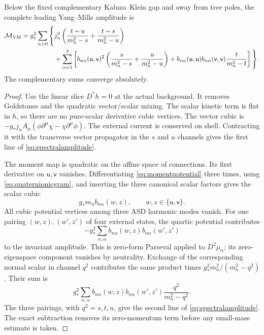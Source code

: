 \begin{proposition}\label{prop:spectralamplitude}
Below the fixed complementary Kaluza--Klein gap and away from tree poles,
the complete leading Yang--Mills amplitude is
\begin{align}\label{eq:spectralamplitude}
 \mathcal M_{\rm YM}=g_*^2\sum_{n>0}\Bigg\{&
 j_n^2\left(\frac{t-u}{m_n^2-s}+\frac{t-s}{m_n^2-u}\right)\nonumber\\
 &+\sum_{\alpha=1}^3\left[
 b_{n\alpha}(\mathsf u,\mathsf v)^2
 \left(\frac{s}{m_n^2-s}+\frac{u}{m_n^2-u}\right)
 +b_{n\alpha}(\mathsf u,\mathsf u)b_{n\alpha}(\mathsf v,\mathsf v)
 \frac{t}{m_n^2-t}\right]\Bigg\}.
\end{align}
The complementary sums converge absolutely.
\end{proposition}
\begin{proof}
Use the linear slice $D^*h=0$ at the actual background. It removes
Goldstones and the quadratic vector/scalar mixing. The scalar kinetic
term is flat in $h$, so there are no pure-scalar derivative cubic
vertices. The vector cubic is
$-g_*j_n A_\mu(\phi\partial^\mu\chi-\chi\partial^\mu\phi)$.
The external current is conserved on shell. Contracting it with the
transverse vector propagator in the $s$ and $u$ channels gives the first
line of \eqref{eq:spectralamplitude}.

The moment map is quadratic on the affine space of connections. Its
first derivative on $\mathsf u,\mathsf v$ vanishes. Differentiating
\eqref{eq:momentpotential} three times, using
\eqref{eq:quaternionicgram}, and inserting the three canonical scalar
factors gives the scalar cubic
\begin{equation}\label{eq:scalarcubic}
 g_*m_n b_{n\alpha}(w,z),\qquad w,z\in\{\mathsf u,\mathsf v\}.
\end{equation}
All cubic potential vertices among three ASD harmonic modes vanish.
For one pairing $(w,z),(w',z')$ of four external states, the quartic
potential contributes
\[
 -g_*^2\sum_{n,\alpha}b_{n\alpha}(w,z)b_{n\alpha}(w',z')
\]
to the invariant amplitude. This is zero-form Parseval applied to
$D^2\mu_\alpha$; its zero-eigenspace component vanishes by neutrality.
Exchange of the corresponding normal scalar in channel $q^2$ contributes
the same product times $g_*^2m_n^2/(m_n^2-q^2)$. Their sum is
\begin{equation}\label{eq:contactcancellation}
 g_*^2\sum_{n,\alpha}b_{n\alpha}(w,z)b_{n\alpha}(w',z')
                         \frac{q^2}{m_n^2-q^2}.
\end{equation}
The three pairings, with $q^2=s,t,u$, give the second line of
\eqref{eq:spectralamplitude}. The exact subtraction removes its
zero-momentum term before any small-mass estimate is taken.


\end{proof}
